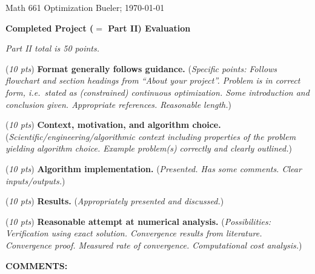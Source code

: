 \documentclass[12pt]{amsart}
\begin{document}
\scriptsize \noindent Math 661 Optimization \hfill  Bueler; \today
\normalsize\bigskip

\thispagestyle{empty}
\noindent\large\centerline{\textbf{Completed Project ($=$ Part II) Evaluation}} \normalsize

\medskip
\noindent\centerline{\emph{Part II total is 50 points.}}

\bigskip\bigskip

\noindent (\emph{10 pts}) \textbf{Format generally follows guidance.} (\emph{Specific points:  Follows flowchart and section headings from ``About your project''.  Problem is in correct form, i.e.~stated as (constrained) continuous optimization.  Some introduction and conclusion given.  Appropriate references.  Reasonable length.})
\vspace{0.6in}

\noindent (\emph{10 pts}) \textbf{Context, motivation, and algorithm choice.}  (\emph{Scientific/engineering/algorithmic context including properties of the problem yielding algorithm choice.  Example problem(s) correctly and clearly outlined.})
\vspace{0.6in}

\noindent (\emph{10 pts}) \textbf{Algorithm implementation.}  (\emph{Presented.  Has some comments.  Clear inputs/outputs.})
\vspace{0.6in}

\noindent (\emph{10 pts}) \textbf{Results.}  (\emph{Appropriately presented and discussed.})
\vspace{0.6in}

\noindent (\emph{10 pts}) \textbf{Reasonable attempt at numerical analysis.}  (\emph{Possibilities:  Verification using exact solution.  Convergence results from literature.  Convergence proof.  Measured rate of convergence.  Computational cost analysis.})
\vspace{0.8in}


\noindent \textbf{COMMENTS:}
\vfill
\end{document}
